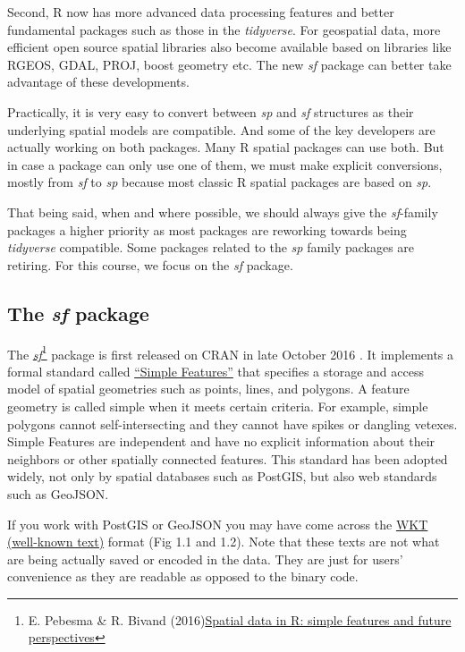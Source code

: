 \documentclass[
  11pt,
]{book}
\begin{document}
Second, R now has more advanced data processing features and better fundamental packages such as those in the \emph{tidyverse}. For geospatial data, more efficient open source spatial libraries also become available based on libraries like RGEOS, GDAL, PROJ, boost geometry etc. The new \emph{sf} package can better take advantage of these developments.

Practically, it is very easy to convert between \emph{sp} and \emph{sf} structures as their underlying spatial models are compatible. And some of the key developers are actually working on both packages. Many R spatial packages can use both. But in case a package can only use one of them, we must make explicit conversions, mostly from \emph{sf} to \emph{sp} because most classic R spatial packages are based on \emph{sp}.

That being said, when and where possible, we should always give the \emph{sf}-family packages a higher priority as most packages are reworking towards being \emph{tidyverse} compatible. Some packages related to the \emph{sp} family packages are retiring. For this course, we focus on the \emph{sf} package.

\hypertarget{the-sf-package}{%
\subsection{\texorpdfstring{The \emph{sf} package}{The sf package}}\label{the-sf-package}}

The \href{https://cran.r-project.org/package=sf}{\emph{sf}}\footnote{E. Pebesma \& R. Bivand (2016)\href{http://pebesma.staff.ifgi.de/pebesma_sfr.pdf}{Spatial data in R: simple features and
  future perspectives}} package is first released on CRAN in late October 2016 . It implements a formal standard called \href{https://en.wikipedia.org/wiki/Simple_Features}{``Simple Features''} that specifies a storage and access model of spatial geometries such as points, lines, and polygons. A feature geometry is called simple when it meets certain criteria. For example, simple polygons cannot self-intersecting and they cannot have spikes or dangling vetexes. Simple Features are independent and have no explicit information about their neighbors or other spatially connected features. This standard has been adopted widely, not only by spatial databases such as PostGIS, but also web standards such as GeoJSON.

If you work with PostGIS or GeoJSON you may have come across the \href{https://en.wikipedia.org/wiki/Well-known_text}{WKT (well-known text)} format (Fig 1.1 and 1.2). Note that these texts are not what are being actually saved or encoded in the data. They are just for users' convenience as they are readable as opposed to the binary code.
\end{document}
